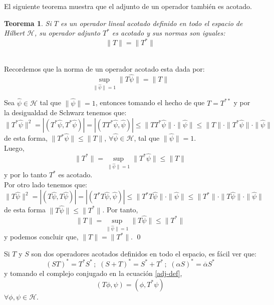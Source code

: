 \documentclass[12pt]{book}
\numberwithin{equation}{chapter}
\newtheorem{theorem}{Teorema}[chapter]
\def\n{\noindent}
\def\ol{\overline}
\def\H{\mathcal{H}}
\def\hpsi{\hat{\psi}}
\begin{document}
El siguiente teorema muestra que el adjunto de un operador tambi\'en es acotado.

\begin{theorem}\label{t-ad-nor}
Si $T$ es un operador lineal acotado definido en todo el espacio de Hilbert $\H$, su operador adjunto $T^{*}$ es acotado y sus normas son iguales:
\begin{equation}
\| T \| = \| T^{*} \|
\end{equation}
\end{theorem}
\n {\bf Demostraci\'on}\\
Recordemos que la norma de un operador acotado esta dada por:
$$\sup_{ \|\hat{\psi}\|=1 } \| T \hat{\psi} \|= \| T \| $$

Sea $\hpsi \in \H$ tal que $ \| \hpsi \|=1 $, entonces tomando el hecho de que $T=T^{* *}$ y por la desigualdad de Schwarz tenemos que:
$$ \| T^{*} \hpsi \|^{2} = |( T^{*}\hpsi , T^{*}\hpsi  )| = |( TT^{*}\hpsi ,\hpsi  )| \leq \| TT^{*} \hpsi \| \cdot \| \hpsi \| \leq \|T\| \cdot \| T^{*} \hpsi \| \cdot \| \hpsi \| $$
de esta forma, $  \| T^{*} \hpsi \| \leq \|T\| $, $\forall \hpsi \in \H$, tal que $\| \hpsi \|=1$.\\
Luego,
\begin{equation}
\|T^{*}\| = \sup_{\| \hpsi \|=1} \| T^{*} \hpsi \| \leq \|T\|
\end{equation}
y por lo tanto $T^{*}$ es acotado.\\
Por otro lado tenemos que:
$$ \| T \hpsi \|^{2} = | ( T \hpsi ,T \hpsi ) | = | (T^{*} T \hpsi , \hpsi ) | \leq \| T^{*} T \hpsi \| \cdot \| \hpsi \| \leq \| T^{*} \| \cdot \| T \hpsi \| \cdot \| \hpsi \| $$
de esta forma $ \| T \hpsi \| \leq \| T^{*} \| $. Por tanto,
\begin{equation}
\| T \| = \sup_{ \| \hpsi \|=1 } \| T\hpsi \| \leq \| T^{*} \|
\end{equation}
y podemos concluir que, $\| T \| = \| T^{*} \|$. \qed

\vspace{5 mm}

Si $T$ y $S$ son dos operadores acotados definidos en todo el espacio, es f\'acil ver que:
\begin{equation}\label{ad-prs}
( ST )^{*} = T^{*} S^{*} \,;\,\, (S+T)^{*}= S^{*}+T^{*} \,;\,\, (\alpha S)^{*}= \ol{\alpha}S^{*}
\end{equation}
y tomando el complejo conjugado en la ecuaci\'on \eqref{adj-def},
\begin{equation}
( T\phi ,\psi )= ( \phi , T^{*} \psi )
\end{equation}
$\forall \phi , \psi \in \H$.
\end{document}
